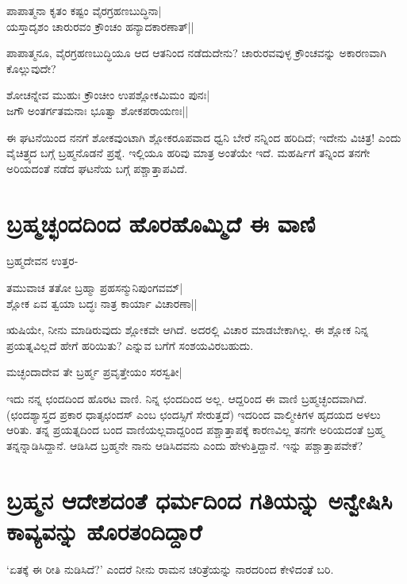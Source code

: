 \begin{shloka}
ಪಾಪಾತ್ಮನಾ ಕೃತಂ ಕಷ್ಟಂ ವೈರಗ್ರಹಣಬುದ್ಧಿನಾ|\\ 
ಯಸ್ತಾದೃಶಂ ಚಾರುರವಂ ಕ್ರೌಂಚಂ ಹನ್ಯಾದಕಾರಣಾತ್‍||
\end{shloka}

ಪಾಪಾತ್ಮನೂ, ವೈರಗ್ರಹಣಬುದ್ಧಿಯೂ ಆದ ಆತನಿಂದ ನಡೆದುದೇನು? ಚಾರುರವವುಳ್ಳ ಕ್ರೌಂಚವನ್ನು ಅಕಾರಣವಾಗಿ ಕೊಲ್ಲುವುದೇ? 

\begin{shloka}
ಶೋಚನ್ನೇವ ಮುಹುಃ ಕ್ರೌಂಚೀಂ ಉಪಶ್ಲೋಕಮಿಮಂ ಪುನಃ|\\ 
ಜಗೌ ಅಂತರ್ಗತಮನಾಃ ಭೂತ್ವಾ ಶೋಕಪರಾಯಣಃ||
\end{shloka}

ಈ ಘಟನೆಯಿಂದ ನನಗೆ ಶೋಕವುಂಟಾಗಿ ಶ್ಲೋಕರೂಪವಾದ ಧ್ವನಿ ಬೇರೆ ನನ್ನಿಂದ ಹರಿದಿದೆ; ಇದೇನು ವಿಚಿತ್ರ! ಎಂದು ವೈಚಿತ್ರ್ಯದ ಬಗ್ಗೆ ಬ್ರಹ್ಮನೊಡನೆ ಪ್ರಶ್ನೆ. ಇಲ್ಲಿಯೂ ಹರಿವು ಮಾತ್ರ ಅಂತೆಯೇ ಇದೆ. ಮಹರ್ಷಿಗೆ ತನ್ನಿಂದ ತನಗೇ ಅರಿಯದಂತೆ ನಡೆದ ಘಟನೆಯ ಬಗ್ಗೆ ಪಶ್ಚಾತ್ತಾಪವಿದೆ. 

\section*{ಬ್ರಹ್ಮಚ್ಛಂದದಿಂದ ಹೊರಹೊಮ್ಮಿದೆ ಈ ವಾಣಿ} 

ಬ್ರಹ್ಮದೇವನ ಉತ್ತರ- 

\begin{shloka}
ತಮುವಾಚ ತತೋ ಬ್ರಹ್ಮಾ ಪ್ರಹಸನ್ಮುನಿಪುಂಗವಮ್‍|\\ 
ಶ್ಲೋಕ ಏವ ತ್ವಯಾ ಬದ್ಧಃ ನಾತ್ರ ಕಾರ್ಯಾ ವಿಚಾರಣಾ||
\end{shloka}

ಋಷಿಯೇ, ನೀನು ಮಾಡಿರುವುದು ಶ್ಲೋಕವೇ ಆಗಿದೆ. ಅದರಲ್ಲಿ ವಿಚಾರ ಮಾಡಬೇಕಾಗಿಲ್ಲ. ಈ ಶ್ಲೋಕ ನಿನ್ನ ಪ್ರಯತ್ನವಿಲ್ಲದೆ ಹೇಗೆ ಹರಿಯಿತು? ಎನ್ನುವ ಬಗೆಗೆ ಸಂಶಯವಿರಬಹುದು. 

\begin{shloka}
ಮಚ್ಛಂದಾದೇವ ತೇ ಬ್ರರ್ಹ್ಮ ಪ್ರವೃತ್ತೇಯಂ ಸರಸ್ವತೀ|
\end{shloka}

ಇದು ನನ್ನ ಛಂದದಿಂದ ಹೊರಟ ವಾಣಿ. ನಿನ್ನ ಛಂದದಿಂದ ಅಲ್ಲ. ಆದ್ದರಿಂದ ಈ ವಾಣಿ ಬ್ರಹ್ಮಚ್ಛಂದವಾಗಿದೆ. (ಛಂದಶ್ಯಾಸ್ತ್ರದ ಪ್ರಕಾರ ಧಾತೃಛಂದಸ್‍ ಎಂಬ ಛಂದಸ್ಸಿಗೆ ಸೇರುತ್ತದೆ) ಇದರಿಂದ ವಾಲ್ಮೀಕಿಗಳ ಹೃದಯದ ಅಳಲು ಆರಿತು. ತನ್ನ ಪ್ರಯತ್ನದಿಂದ ಬಂದ ವಾಣಿಯಲ್ಲವಾದ್ದರಿಂದ ಪಶ್ಚಾತ್ತಾಪಕ್ಕೆ ಕಾರಣವಿಲ್ಲ ತನಗೇ ಅರಿಯದಂತೆ ಬ್ರಹ್ಮ ತನ್ನನ್ನಾಡಿಸಿದ್ದಾನೆ. ಆಡಿಸಿದ ಬ್ರಹ್ಮನೇ ನಾನು ಆಡಿಸಿದವನು ಎಂದು ಹೇಳುತ್ತಿದ್ದಾನೆ. ಇನ್ನು ಪಶ್ಚಾತ್ತಾಪವೇಕೆ? 

\section*{ಬ್ರಹ್ಮನ ಆದೇಶದಂತೆ ಧರ್ಮದಿಂದ ಗತಿಯನ್ನು ಅನ್ವೇಷಿಸಿ ಕಾವ್ಯವನ್ನು ಹೊರತಂದಿದ್ದಾರೆ} 

`ಏತಕ್ಕೆ ಈ ರೀತಿ ನುಡಿಸಿದೆ?' ಎಂದರೆ ನೀನು ರಾಮನ ಚರಿತ್ರೆಯನ್ನು ನಾರದರಿಂದ ಕೇಳಿದಂತೆ ಬರಿ. 

